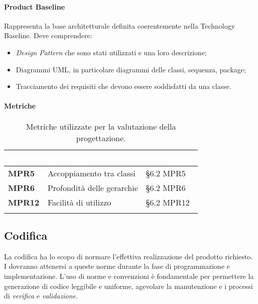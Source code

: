 \paragraph{Product Baseline}
Rappresenta la base architetturale definita coerentemente nella Technology Baseline. Deve comprendere:
\begin{itemize}
	\item {\textit{Design Pattern}} che sono stati utilizzati e una loro descrizione;
	\item Diagrammi UML, in particolare diagrammi delle classi, sequenza, package;
	\item Tracciamento dei requisiti che devono essere soddisfatti da una classe.
\end{itemize}

\paragraph{Metriche}
\setlength{\freewidth}{\dimexpr\textwidth-0\tabcolsep}
\renewcommand{\arraystretch}{1.5}
\setlength{\aboverulesep}{0pt}
\setlength{\belowrulesep}{0pt}
\begin{longtable}{L{.22\freewidth} L{.4\freewidth} L{.2\freewidth}}
	\toprule
	\textcolor{white}{\textbf{Metrica}}&
	\textcolor{white}{\textbf{Descrizione}}&	
	\textcolor{white}{\textbf{Riferimento}}\\	
	\toprule
	\endhead
	
	\textbf{MPR5} & Accoppiamento tra classi & \S 6.2 MPR5 \\
	\textbf{MPR6} & Profondità delle gerarchie & \S 6.2 MPR6 \\
	\textbf{MPR12} & Facilità di utilizzo & \S 6.2 MPR12 \\
	
	\bottomrule
	\caption*{Metriche utilizzate per la valutazione della progettazione.}
\end{longtable}

\subsection{Codifica} %
La codifica ha lo scopo di normare l'effettiva realizzazione del prodotto richiesto. I \progrs{} dovranno attenersi a queste norme durante la fase di programmazione e implementazione.
L'uso di norme e convenzioni è fondamentale per permettere la generazione di codice leggibile e uniforme, agevolare la manutenzione e i processi di \emph{verifica} e \emph{validazione}.

